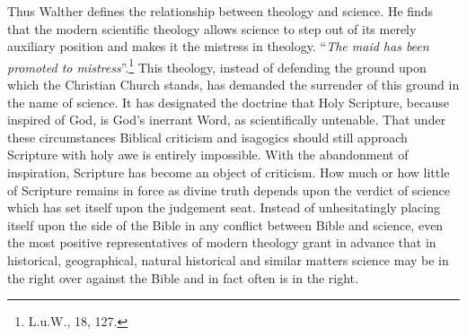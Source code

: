                 Thus Walther defines the relationship between theology and science.  He finds that the modern scientific theology allows science to step out of its merely auxiliary position and makes it the mistress in theology.  “\textit{The maid has been promoted to mistress}”.\footnote{L.u.W., 18, 127.}  This theology, instead of defending the ground upon which the Christian Church stands, has demanded the surrender of this ground in the name of science.  It has designated the doctrine that Holy Scripture, because inspired of God, is God’s inerrant Word, as scientifically untenable.  That under these circumstances Biblical criticism and isagogics should still approach Scripture with holy awe is entirely impossible.  With the abandonment of inspiration, Scripture has become an object of criticism.  How much or how little of Scripture remains in force as divine truth depends upon the verdict of science which has set itself upon the judgement seat.  Instead of unhesitatingly placing itself upon the side of the Bible in any conflict between Bible and science, even the most positive representatives of modern theology grant in advance that in historical, geographical, natural historical and similar matters science may be in the right over against the Bible and in fact often is in the right.

